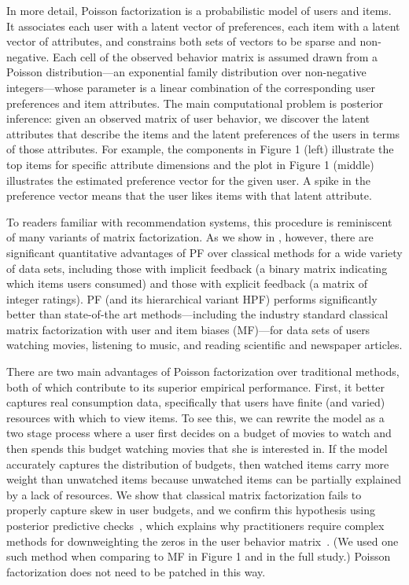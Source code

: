 In more detail, Poisson factorization is a probabilistic model of
users and items.  It associates each user with a latent vector of
preferences, each item with a latent vector of attributes, and
constrains both sets of vectors to be sparse and non-negative.  Each
cell of the observed behavior matrix is assumed drawn from a Poisson
distribution---an exponential family distribution over non-negative
integers---whose parameter is a linear combination of the
corresponding user preferences and item attributes.  The main
computational problem is posterior inference: given an observed matrix
of user behavior, we discover the latent attributes that describe the
items and the latent preferences of the users in terms of those
attributes.  For example, the components in Figure 1 (left) illustrate
the top items for specific attribute dimensions and the plot in Figure
1 (middle) illustrates the estimated preference vector for the given
user.  A spike in the preference vector means that the user likes
items with that latent attribute.

To readers familiar with recommendation systems, this procedure is
reminiscent of many variants of matrix factorization. As we show in
, however, there are significant quantitative advantages
of PF over classical methods for a wide variety of data sets,
including those with implicit feedback (a binary matrix indicating
which items users consumed) and those with explicit feedback (a matrix
of integer ratings). PF (and its hierarchical variant HPF) performs
significantly better than state-of-the art methods---including the
industry standard classical matrix factorization with user and item
biases (MF)---for data sets of users watching movies, listening to
music, and reading scientific and newspaper articles.

There are two main advantages of Poisson factorization over
traditional methods, both of which contribute to its superior
empirical performance.  First, it better captures real consumption
data, specifically that users have finite (and varied) resources with
which to view items.  To see this, we can rewrite the model as a two
stage process where a user first decides on a budget of movies to
watch and then spends this budget watching movies that she is
interested in.  If the model accurately captures the distribution of
budgets, then watched items carry more weight than unwatched items
because unwatched items can be partially explained by a lack of
resources. We show that classical matrix factorization fails to
properly capture skew in user budgets, and we confirm this
hypothesis using posterior predictive checks~\cite{Gelman:1996}, which
explains why practitioners require complex methods for downweighting
the zeros in the user behavior
matrix~\cite{Hu:2008p9402,Gantner:2012p9364,Dror:2012a,Paquet:2013p9197}.
(We used one such method when comparing to MF in Figure 1 and in the
full study.)  Poisson factorization does not need to be patched in
this way.


